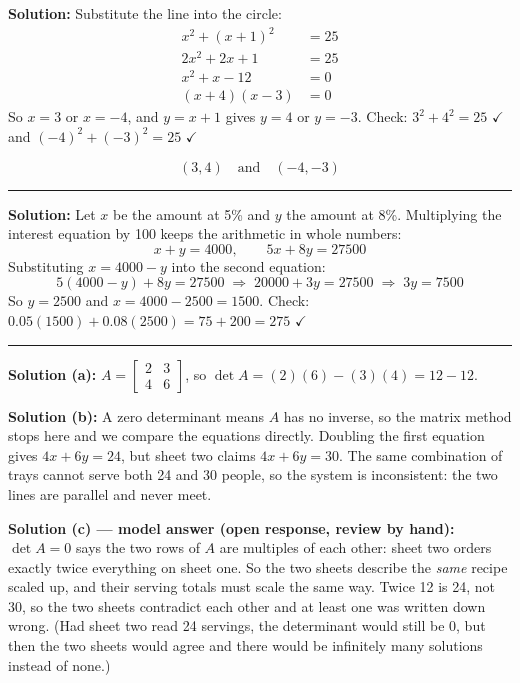 \documentclass[12pt]{article}
\begin{document}
\textbf{Solution:} Substitute the line into the circle:
\begin{align*}
  x^2 + (x + 1)^2 &= 25 \\
  2x^2 + 2x + 1 &= 25 \\
  x^2 + x - 12 &= 0 \\
  (x + 4)(x - 3) &= 0
\end{align*}
So $x = 3$ or $x = -4$, and $y = x + 1$ gives $y = 4$ or $y = -3$.
Check: $3^2 + 4^2 = 25$ $\checkmark$ and $(-4)^2 + (-3)^2 = 25$ $\checkmark$

\[ \boxed{(3,4) \quad \text{and} \quad (-4,-3)} \]

\vspace{0.2cm}\noindent\rule{\linewidth}{0.2pt}


\textbf{Solution:} Let $x$ be the amount at 5\% and $y$ the amount at 8\%.
Multiplying the interest equation by 100 keeps the arithmetic in whole numbers:
\[ x + y = 4000, \qquad 5x + 8y = 27500 \]
Substituting $x = 4000 - y$ into the second equation:
\[ 5(4000 - y) + 8y = 27500 \;\Longrightarrow\; 20000 + 3y = 27500 \;\Longrightarrow\; 3y = 7500 \]
So $y = 2500$ and $x = 4000 - 2500 = 1500$.
Check: $0.05(1500) + 0.08(2500) = 75 + 200 = 275$ $\checkmark$

\vspace{0.2cm}\noindent\rule{\linewidth}{0.2pt}


\textbf{Solution (a):} $A = \begin{bmatrix} 2 & 3 \\ 4 & 6 \end{bmatrix}$, so
$\det A = (2)(6) - (3)(4) = 12 - 12$.

\textbf{Solution (b):} A zero determinant means $A$ has no inverse, so the matrix
method stops here and we compare the equations directly. Doubling the first
equation gives $4x + 6y = 24$, but sheet two claims $4x + 6y = 30$. The same
combination of trays cannot serve both 24 and 30 people, so the system is
inconsistent: the two lines are parallel and never meet.

\textbf{Solution (c) --- model answer (open response, review by hand):}
$\det A = 0$ says the two rows of $A$ are multiples of each other: sheet two orders
exactly twice everything on sheet one. So the two sheets describe the \emph{same}
recipe scaled up, and their serving totals must scale the same way. Twice 12 is 24,
not 30, so the two sheets contradict each other and at least one was written down
wrong. (Had sheet two read 24 servings, the determinant would still be $0$, but then
the two sheets would agree and there would be infinitely many solutions instead of none.)
\end{document}
